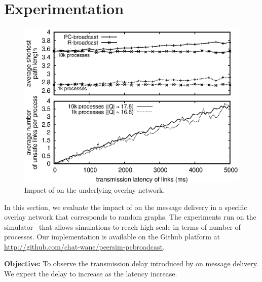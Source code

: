 
\section{Experimentation}
\label{sec:experimentation}


\begin{figure}
  \begin{center}
    \includegraphics[width=1.5\columnwidth]{./img/delay.eps}
    \caption{\label{fig:delay}Impact of \CBROADCAST on the underlying overlay
      network.}
  \end{center}
\end{figure}


In this section, we evaluate the impact of \CBROADCAST on the message delivery
in a specific overlay network that corresponds to random graphs. The experiments
run on the \PEERSIM simulator~\cite{montresor2009peersim} that allows
simulations to reach high scale in terms of number of processes. Our
implementation is available on the Github
platform at \url{http://github.com/chat-wane/peersim-pcbroadcast}.


\noindent \textbf{Objective:} To observe the transmission delay introduced by
\CBROADCAST on message delivery. We expect the delay to increase as the latency
increase.

